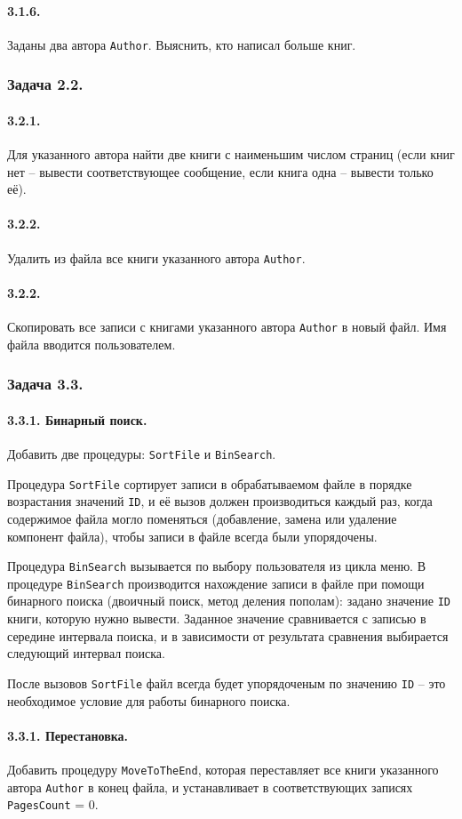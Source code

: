 \documentclass[12pt,a4paper]{report}
\begin{document}
\paragraph{3.1.6.} Заданы два автора \texttt{Author}. Выяснить, кто написал больше книг.

\subsubsection*{Задача 2.2.}
\paragraph{3.2.1.} Для указанного автора найти две книги с наименьшим числом страниц (если книг нет -- вывести соответствующее сообщение, если книга одна -- вывести только её).
\paragraph{3.2.2.} Удалить из файла все книги указанного автора \texttt{Author}.
\paragraph{3.2.2.} Скопировать все записи с книгами указанного автора \texttt{Author} в новый файл. Имя файла вводится пользователем.


\subsubsection*{Задача 3.3.}
\paragraph{3.3.1. Бинарный поиск.} Добавить две процедуры: \texttt{SortFile} и \texttt{BinSearch}.

Процедура \texttt{SortFile} сортирует записи в обрабатываемом файле в порядке возрастания значений \texttt{ID}, и её вызов должен производиться каждый раз, когда содержимое файла могло поменяться (добавление, замена или удаление компонент файла), чтобы записи в файле всегда были упорядочены.

Процедура \texttt{BinSearch} вызывается по выбору пользователя из цикла меню. В процедуре \texttt{BinSearch} производится нахождение записи в файле при помощи бинарного поиска (двоичный поиск, метод деления пополам): задано значение \texttt{ID} книги, которую нужно вывести. Заданное значение сравнивается с записью в середине интервала поиска, и в зависимости от результата сравнения выбирается следующий интервал поиска.

После вызовов \texttt{SortFile} файл всегда будет упорядоченым по значению \texttt{ID} -- это необходимое условие для работы бинарного поиска.

\paragraph{3.3.1. Перестановка.} Добавить процедуру \texttt{MoveToTheEnd}, которая переставляет все книги указанного автора \texttt{Author} в конец файла, и устанавливает в соответствующих записях \texttt{PagesCount} = 0.
\end{document}

